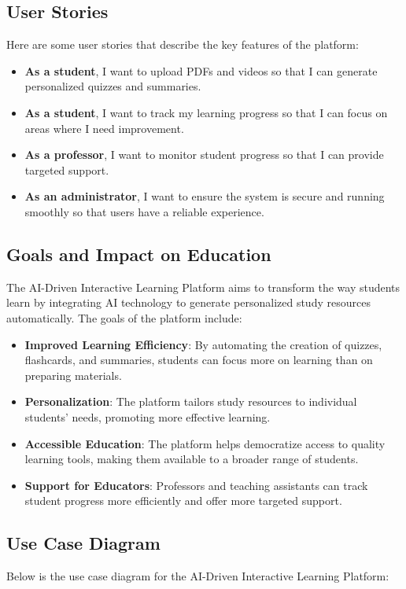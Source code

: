 \documentclass{article}
\begin{document}
\subsection{User Stories}
Here are some user stories that describe the key features of the platform:
\begin{itemize}
    \item \textbf{As a student}, I want to upload PDFs and videos so that I can generate personalized quizzes and summaries.
    \item \textbf{As a student}, I want to track my learning progress so that I can focus on areas where I need improvement.
    \item \textbf{As a professor}, I want to monitor student progress so that I can provide targeted support.
    \item \textbf{As an administrator}, I want to ensure the system is secure and running smoothly so that users have a reliable experience.
\end{itemize}

\subsection{Goals and Impact on Education}
The AI-Driven Interactive Learning Platform aims to transform the way students learn by integrating AI technology to generate personalized study resources automatically. The goals of the platform include:
\begin{itemize}
    \item \textbf{Improved Learning Efficiency}: By automating the creation of quizzes, flashcards, and summaries, students can focus more on learning than on preparing materials.
    \item \textbf{Personalization}: The platform tailors study resources to individual students’ needs, promoting more effective learning.
    \item \textbf{Accessible Education}: The platform helps democratize access to quality learning tools, making them available to a broader range of students.
    \item \textbf{Support for Educators}: Professors and teaching assistants can track student progress more efficiently and offer more targeted support.
\end{itemize}

\subsection{Use Case Diagram}
Below is the use case diagram for the AI-Driven Interactive Learning Platform:
\end{document}
